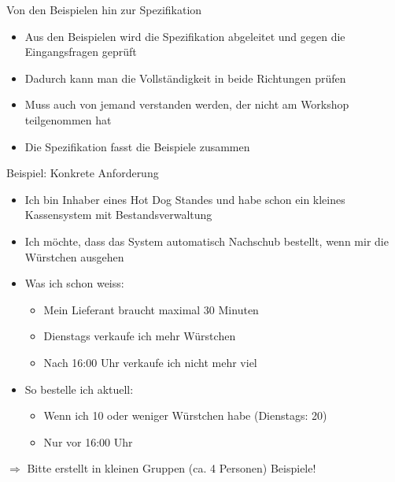 \begin{frame}{Von den Beispielen hin zur Spezifikation}

\begin{itemize}
	\item Aus den Beispielen wird die Spezifikation abgeleitet und gegen die Eingangsfragen geprüft
	\item Dadurch kann man die Vollständigkeit in beide Richtungen prüfen
	\item Muss auch von jemand verstanden werden, der nicht am Workshop teilgenommen hat
	\item Die Spezifikation fasst die Beispiele zusammen
\end{itemize}

\end{frame}
 
\begin{frame}{Beispiel: Konkrete Anforderung}

\begin{itemize}
	\item Ich bin Inhaber eines Hot Dog Standes und habe schon ein kleines Kassensystem mit Bestandsverwaltung
	\item Ich möchte, dass das System automatisch Nachschub bestellt, wenn mir die Würstchen ausgehen
	
	\item Was ich schon weiss:
	\begin{itemize}
		\item Mein Lieferant braucht maximal 30 Minuten
		\item Dienstags verkaufe ich mehr Würstchen
		\item Nach 16:00 Uhr verkaufe ich nicht mehr viel
	\end{itemize}
	
	\item So bestelle ich aktuell:
	\begin{itemize}
		\item Wenn ich 10 oder weniger Würstchen habe (Dienstags: 20)
		\item Nur vor 16:00 Uhr
	\end{itemize}
\end{itemize}
	
$\Rightarrow$ Bitte erstellt in kleinen Gruppen (ca. 4 Personen) Beispiele!

\end{frame}


